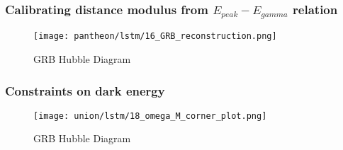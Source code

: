\subsubsection{Calibrating distance modulus from $E_{peak}-E_{gamma}$ relation}
\begin{figure}[H]
	\centering
	\texttt{[image: pantheon/lstm/16\_GRB\_reconstruction.png]}
	\caption{GRB Hubble Diagram}
	\label{fig:HD_GRB_LSTM_union}
\end{figure}
\subsubsection{Constraints on dark energy}
\begin{figure}[H]
	\centering
	\texttt{[image: union/lstm/18\_omega\_M\_corner\_plot.png]}
	\caption{GRB Hubble Diagram}
	\label{fig:OmegaM_lstm_union}
\end{figure}
